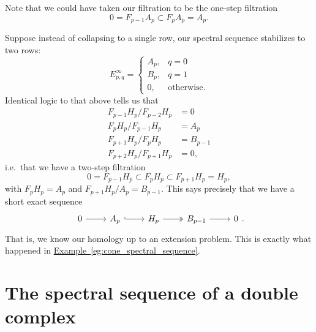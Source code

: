 \documentclass[main.tex]{subfiles}
\begin{document}
\begin{example}
  Note that we could have taken our filtration to be the one-step filtration
  \begin{equation*}
    0 = F_{p-1}A_{p} \subset F_{p}A_{p} = A_{p}.
  \end{equation*}
\end{example}

\begin{example}
  Suppose instead of collapsing to a single row, our spectral sequence stabilizes to two rows:
  \begin{equation*}
    E^{\infty}_{p, q} =
    \begin{cases}
      A_{p}, &q = 0 \\
      B_{p}, &q = 1 \\
      0, &\text{otherwise.}
    \end{cases}
  \end{equation*}
  Identical logic to that above tells us that
  \begin{align*}
    F_{p-1}H_{p}/F_{p-2}H_{p} &= 0 \\
    F_{p}H_{p}/F_{p-1}H_{p} &= A_{p} \\
    F_{p+1}H_{p}/F_{p}H_{p} &= B_{p-1} \\
    F_{p+2}H_{p}/F_{p+1}H_{p} &= 0,
  \end{align*}
  i.e.\ that we have a two-step filtration
  \begin{equation*}
    0 = F_{p-1}H_{p} \subset F_{p}H_{p} \subset F_{p+1}H_{p} = H_{p},
  \end{equation*}
  with $F_{p}H_{p} = A_{p}$ and $F_{p+1}H_{p}/A_{p} = B_{p-1}$. This says precisely that we have a short exact sequence
  \begin{equation*}
    \begin{tikzcd}
      0
      \arrow[r]
      & A_{p}
      \arrow[r, hook]
      & H_{p}
      \arrow[r, two heads]
      & B_{p-1}
      \arrow[r]
      & 0
    \end{tikzcd}.
  \end{equation*}
  That is, we know our homology up to an extension problem. This is exactly what happened in \hyperref[eg:cone_spectral_sequence]{Example~\ref*{eg:cone_spectral_sequence}}.
\end{example}

\section{The spectral sequence of a double complex}
\label{sec:the_spectral_sequence_of_a_double_complex}
\end{document}
